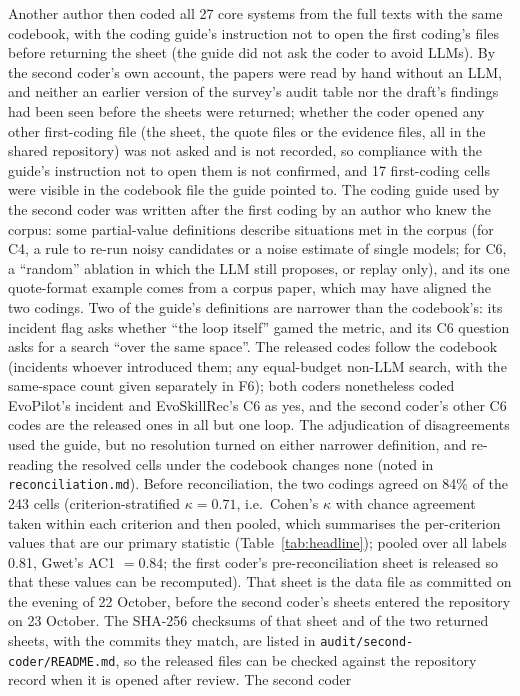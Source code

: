 \documentclass[sigconf,nonacm]{acmart}
\begin{document}
Another author then coded all 27 core systems from the full texts with the same codebook, with the coding guide's instruction not to open the first coding's files before returning the sheet (the guide did not ask the coder to avoid LLMs). By the second coder's own account, the papers were read by hand without an LLM, and neither an earlier version of the survey's audit table nor the draft's findings had been seen before the sheets were returned; whether the coder opened any other first-coding file (the sheet, the quote files or the evidence files, all in the shared repository) was not asked and is not recorded, so compliance with the guide's instruction not to open them is not confirmed, and 17 first-coding cells were visible in the codebook file the guide pointed to. The coding guide used by the second coder was written after the first coding by an author who knew the
corpus: some partial-value definitions describe situations met in the corpus (for C4, a rule to re-run noisy candidates or a noise estimate of single models; for C6, a ``random'' ablation in which the LLM still proposes, or replay only), and its one quote-format example comes from a corpus paper, which may have aligned the two codings. Two of the guide's definitions are narrower than the codebook's: its incident flag asks whether ``the loop itself'' gamed the metric, and its C6 question asks for a search ``over the same space''. The released codes follow the codebook (incidents whoever introduced them; any equal-budget non-LLM search, with the same-space count given separately in F6); both coders nonetheless coded EvoPilot's incident and EvoSkillRec's C6 as yes, and the second coder's other C6 codes are the released ones in all but one loop. The adjudication of disagreements used the guide, but no resolution turned on either narrower definition, and re-reading the resolved cells under the codebook changes none (noted in \texttt{reconciliation.md}). Before reconciliation, the two codings
agreed on 84\% of the 243 cells (criterion-stratified $\kappa = 0.71$, i.e.\ Cohen's $\kappa$ with chance agreement taken within each criterion and then pooled, which summarises the per-criterion values that are our primary statistic (Table~\ref{tab:headline}); pooled over all labels 0.81, Gwet's AC1 $= 0.84$; the first coder's
pre-reconciliation sheet is released so that these values can be recomputed). That sheet is the data file as committed
on the evening of 22 October, before the second coder's sheets entered the repository on 23 October. The SHA-256 checksums of that sheet and of the two returned sheets, with the commits they match, are listed in \texttt{audit/second-coder/README.md}, so the released files can be checked against the repository record when it is opened after review. The second coder
\end{document}
